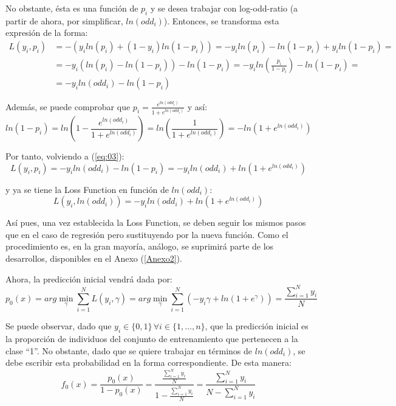 \documentclass[12pt,twoside]{article}
\begin{document}
No obstante, ésta es una función de $p_i$ y se desea trabajar con log-odd-ratio (a partir de ahora, por simplificar, $ln(odd_i)$). Entonces, se transforma esta expresión de la forma:
\begin{equation}
\label{eq:03}
\begin{split}
L(y_i, p_i) &= -(y_i ln(p_i) + (1-y_i)ln(1-p_i)) = -y_i ln(p_i) - ln(1-p_i) + y_i ln(1-p_i) = \\
& = -y_i(ln(p_i) - ln(1-p_i)) - ln(1-p_i) = -y_i ln \left( \frac{p_i}{1-p_i} \right) - ln(1-p_i) = \\
& = -y_i ln(odd_i) - ln(1-p_i)
\end{split}
\end{equation}

Además, se puede comprobar que $p_i = \frac{e^{ln(odd_i)}}{1 + e^{ln(odd_i)}}$ y así:
\begin{equation*}
ln(1-p_i) = ln \left( 1- \frac{e^{ln(odd_i)}}{1 + e^{ln(odd_i)}} \right) = ln \left( \frac{1}{1 + e^{ln(odd_i)}} \right) = - ln \left( 1 + e^{ln(odd_i)} \right)
\end{equation*}

Por tanto, volviendo a (\ref{eq:03}):
\begin{equation*}
L(y_i, p_i) = -y_i ln(odd_i) - ln(1-p_i) = -y_i ln(odd_i) + ln \left( 1 + e^{ln(odd_i)} \right)
\end{equation*}

\noindent
y ya se tiene la Loss Function en función de $ln(odd_i)$:
\begin{equation*}
L(y_i, ln(odd_i)) = -y_i ln(odd_i) + ln \left( 1 + e^{ln(odd_i)} \right)
\end{equation*}

Así pues, una vez establecida la Loss Function, se deben seguir los mismos pasos que en el caso de regresión pero sustituyendo por la nueva función. Como el procedimiento es, en la gran mayoría, análogo, se suprimirá parte de los desarrollos, disponibles en el Anexo (\ref{Anexo2}). 

Ahora, la predicción inicial vendrá dada por:
\begin{equation}
\label{eqn:1}
p_0(x) = arg\min_{\gamma} \sum_{i=1}^N L(y_i, \gamma) = arg\min_{\gamma} \sum_{i=1}^N \left( -y_i \gamma + ln \left( 1 + e^{\gamma} \right) \right) = \frac{\sum_{i=1}^{N} y_i}{N} 
\end{equation}

Se puede observar, dado que $y_i \in \{0, 1 \} \, \forall i \in \{1, \dots, n \}$, que la predicción inicial es la proporción de individuos del conjunto de entrenamiento que pertenecen a la clase ``1''. No obstante, dado que se quiere trabajar en términos de $ln(odd_i)$, se debe escribir esta probabilidad en la forma correspondiente. De esta manera:
\begin{equation*}
f_0(x) = \frac{p_0(x)}{1-p_0(x)} = \frac{\frac{\sum_{i=1}^{N} y_i}{N}}{1 - \frac{\sum_{i=1}^{N} y_i}{N}} = \frac{\sum_{i=1}^{N} y_i}{N -\sum_{i=1}^{N} y_i}
\end{equation*}
\end{document}
